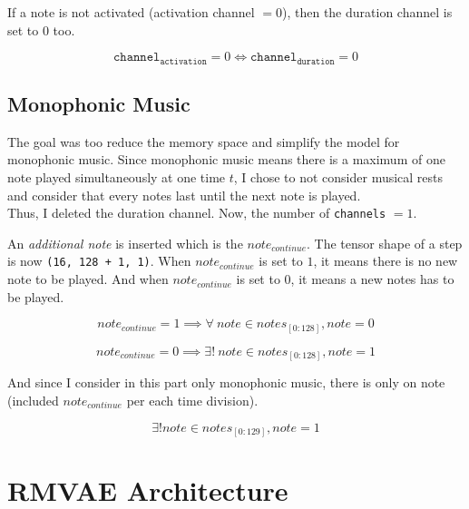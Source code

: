 \documentclass[12pt]{report}
\begin{document}
If a note is not activated (activation channel $ = 0$), then the duration channel is set to $0$ too.

\begin{equation}
    \texttt{channel}_{\texttt{activation}} = 0 \iff \texttt{channel}_{\texttt{duration}} = 0
\end{equation}

\subsection{Monophonic Music}
\label{sec:mono}

The goal was too reduce the memory space and simplify the model for monophonic music.
Since monophonic music means there is a maximum of one note played simultaneously at one time $t$, I chose to not consider musical rests and consider that every notes last until the next note is played.\\
Thus, I deleted the duration channel.
Now, the number of \texttt{channels} $ = 1$.

An \textit{additional note} is inserted which is the $note_{continue}$.
The tensor shape of a step is now \texttt{(16, 128 + 1, 1)}.
When $note_{continue}$ is set to $1$, it means there is no new note to be played.
And when $note_{continue}$ is set to $0$, it means a new notes has to be played.

\begin{equation}
    note_{continue} = 1 \implies \forall~ note \in notes_{[0:128]}, note = 0
\end{equation}

\begin{equation}
    note_{continue} = 0 \implies \exists!~ note \in notes_{[0:128]}, note = 1
\end{equation}

And since I consider in this part only monophonic music, there is only on note (included $note_{continue}$ per each time division).

\begin{equation}
    \exists! note \in notes_{[0:129]}, note = 1
\end{equation}


\section{RMVAE Architecture}
\label{sec:rmvae}
\end{document}
